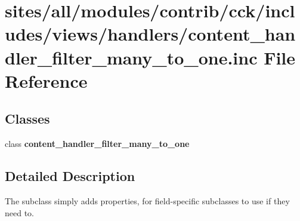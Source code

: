 \hypertarget{content__handler__filter__many__to__one_8inc}{
\section{sites/all/modules/contrib/cck/includes/views/handlers/content\_\-handler\_\-filter\_\-many\_\-to\_\-one.inc File Reference}
\label{content__handler__filter__many__to__one_8inc}
}
\subsection*{Classes}
\begin{CompactItemize}
\item 
class \textbf{content\_\-handler\_\-filter\_\-many\_\-to\_\-one}
\end{CompactItemize}


\subsection{Detailed Description}
The subclass simply adds properties, for field-specific subclasses to use if they need to. 